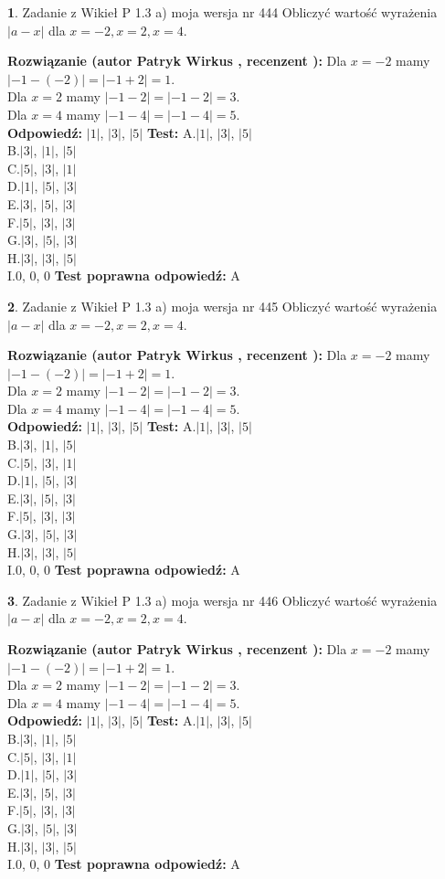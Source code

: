 \documentclass[12pt, a4paper]{article}
\theoremstyle{definition} %
\newtheorem{zad}{}
\newcommand{\zadStart}[1]{\begin{zad}#1\newline}
\newcommand{\zadStop}{\end{zad}}
\newcommand{\rozwStart}[2]{\noindent \textbf{Rozwiązanie (autor #1 , recenzent #2): }\newline}
\newcommand{\rozwStop}{\newline}
\newcommand{\odpStart}{\noindent \textbf{Odpowiedź:}\newline}
\newcommand{\odpStop}{\newline}
\newcommand{\testStart}{\noindent \textbf{Test:}\newline}
\newcommand{\testStop}{\newline}
\newcommand{\kluczStart}{\noindent \textbf{Test poprawna odpowiedź:}\newline}
\newcommand{\kluczStop}{\newline}
\begin{document}
\zadStart{Zadanie z Wikieł P 1.3 a) moja wersja nr 444}
Obliczyć wartość wyrażenia $|a - x|$ dla $x=-2,x=2,x=4$.
\zadStop
\rozwStart{Patryk Wirkus}{}
Dla $x = -2$ mamy $|-1 - (-2)| = |-1 + 2| = 1$.\\
Dla $x = 2$ mamy $|-1 - 2| = |-1 - 2| = 3$.\\
Dla $x = 4$ mamy $|-1 - 4| = |-1 - 4| = 5$.\\
\rozwStop
\odpStart
$|1|$, $|3|$, $|5|$
\odpStop
\testStart
A.$|1|$, $|3|$, $|5|$\\
B.$|3|$, $|1|$, $|5|$\\
C.$|5|$, $|3|$, $|1|$\\
D.$|1|$, $|5|$, $|3|$\\
E.$|3|$, $|5|$, $|3|$\\
F.$|5|$, $|3|$, $|3|$\\
G.$|3|$, $|5|$, $|3|$\\
H.$|3|$, $|3|$, $|5|$\\
I.$0$, $0$, $0$
\testStop
\kluczStart
A
\kluczStop



\zadStart{Zadanie z Wikieł P 1.3 a) moja wersja nr 445}
Obliczyć wartość wyrażenia $|a - x|$ dla $x=-2,x=2,x=4$.
\zadStop
\rozwStart{Patryk Wirkus}{}
Dla $x = -2$ mamy $|-1 - (-2)| = |-1 + 2| = 1$.\\
Dla $x = 2$ mamy $|-1 - 2| = |-1 - 2| = 3$.\\
Dla $x = 4$ mamy $|-1 - 4| = |-1 - 4| = 5$.\\
\rozwStop
\odpStart
$|1|$, $|3|$, $|5|$
\odpStop
\testStart
A.$|1|$, $|3|$, $|5|$\\
B.$|3|$, $|1|$, $|5|$\\
C.$|5|$, $|3|$, $|1|$\\
D.$|1|$, $|5|$, $|3|$\\
E.$|3|$, $|5|$, $|3|$\\
F.$|5|$, $|3|$, $|3|$\\
G.$|3|$, $|5|$, $|3|$\\
H.$|3|$, $|3|$, $|5|$\\
I.$0$, $0$, $0$
\testStop
\kluczStart
A
\kluczStop



\zadStart{Zadanie z Wikieł P 1.3 a) moja wersja nr 446}
Obliczyć wartość wyrażenia $|a - x|$ dla $x=-2,x=2,x=4$.
\zadStop
\rozwStart{Patryk Wirkus}{}
Dla $x = -2$ mamy $|-1 - (-2)| = |-1 + 2| = 1$.\\
Dla $x = 2$ mamy $|-1 - 2| = |-1 - 2| = 3$.\\
Dla $x = 4$ mamy $|-1 - 4| = |-1 - 4| = 5$.\\
\rozwStop
\odpStart
$|1|$, $|3|$, $|5|$
\odpStop
\testStart
A.$|1|$, $|3|$, $|5|$\\
B.$|3|$, $|1|$, $|5|$\\
C.$|5|$, $|3|$, $|1|$\\
D.$|1|$, $|5|$, $|3|$\\
E.$|3|$, $|5|$, $|3|$\\
F.$|5|$, $|3|$, $|3|$\\
G.$|3|$, $|5|$, $|3|$\\
H.$|3|$, $|3|$, $|5|$\\
I.$0$, $0$, $0$
\testStop
\kluczStart
A
\kluczStop
\end{document}
